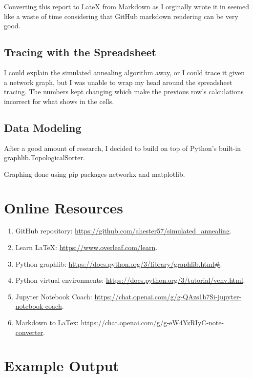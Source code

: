 \documentclass{article}
\begin{document}
Converting this report to LateX from Markdown as I orginally wrote it in 
seemed like a waste of time considering that GitHub markdown rendering can 
be very good.

\subsection{Tracing with the Spreadsheet}

I could explain the simulated annealing algorithm away, or I could trace it 
given a network graph, but I was unable to wrap my head around the spreadsheet 
tracing. The numbers kept changing which make the previous row's calculations 
incorrect for what shows in the cells.

\subsection{Data Modeling}

After a good amount of research, I decided to build on top of Python's built-in 
graphlib.TopologicalSorter.

Graphing done using pip packages networkx and matplotlib.

\section{Online Resources}

\begin{enumerate}
    \item GitHub repository: \url{https://github.com/ahester57/simulated_annealing}.
    \item Learn LaTeX: \url{https://www.overleaf.com/learn}.
    \item Python graphlib: \url{https://docs.python.org/3/library/graphlib.html#}.
    \item Python virtual environments: \url{https://docs.python.org/3/tutorial/venv.html}.
    \item Jupyter Notebook Coach: \url{https://chat.openai.com/g/g-QAzs1b7Si-jupyter-notebook-coach}.
    \item Markdown to LaTex: \url{https://chat.openai.com/g/g-eW4YzRIyC-note-converter}.
\end{enumerate}

\section{Example Output}
\end{document}
